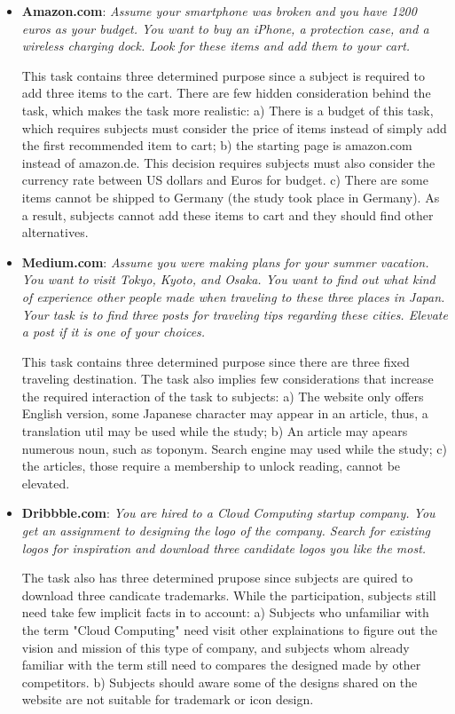 \begin{itemize}
    \item \textbf{Amazon.com}: \emph{Assume your smartphone was broken and you have 1200 euros 
    as your budget. You want to buy an iPhone, a protection case, and a wireless 
    charging dock. Look for these items and add them to your cart.}

        This task contains three determined purpose since a subject is required to add three items
        to the cart. There are few hidden consideration behind the task, which makes the task
        more realistic: a) There is a budget of this task, which requires subjects must consider the
        price of items instead of simply add the first recommended item to cart; 
        b) the starting page is amazon.com instead of amazon.de. This decision requires
        subjects must also consider the currency rate between US dollars and Euros for budget.
        c) There are some items cannot be shipped to Germany (the study took place in Germany).
        As a result, subjects cannot add these items to cart and they should find other alternatives.

    \item \textbf{Medium.com}: \emph{Assume you were making plans for your summer vacation. 
        You want to visit Tokyo, Kyoto, and Osaka. You want to find out what kind of experience other people made 
        when traveling to these three places in Japan. Your task is to find three posts 
        for traveling tips regarding these cities. Elevate a post if it is one of your choices.}

        This task contains three determined purpose since there are three fixed traveling destination.
        The task also implies few considerations that increase the required interaction of the task to subjects:
        a) The website only offers English version, some Japanese character may appear in an article,
        thus, a translation util may be used while the study;
        b) An article may apears numerous noun, such as toponym. Search engine may used while the study;
        c) the articles, those require a membership to unlock reading, cannot be elevated. 


    \item \textbf{Dribbble.com}: \emph{You are hired to a Cloud Computing startup company. You get an assignment to 
        designing the logo of the company. Search for existing logos for inspiration and 
        download three candidate logos you like the most.}

        The task also has three determined prupose since subjects are quired to download three candicate trademarks.
        While the participation, subjects still need take few implicit facts in to account:
        a) Subjects who unfamiliar with the term "Cloud Computing" need visit other explainations to figure out
        the vision and mission of this type of company, and subjects whom already familiar with the term
        still need to compares the designed made by other competitors.
        b) Subjects should aware some of the designs shared on the website are not suitable for trademark or icon design.
\end{itemize}

